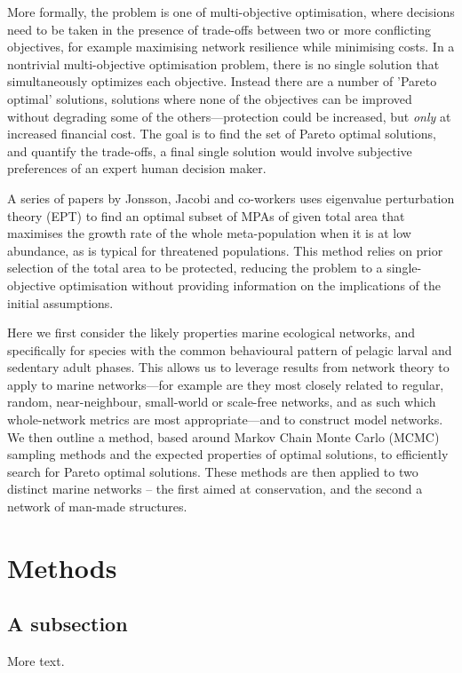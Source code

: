 \documentclass[11pt]{article} %
\begin{document}
More formally, the problem is one of multi-objective optimisation, where decisions need to be taken in the presence of trade-offs between two or more conflicting objectives, for example maximising network resilience while minimising costs. In a nontrivial multi-objective optimisation problem, there is no single solution that simultaneously optimizes each objective. Instead there are a number of 'Pareto optimal' solutions, solutions where none of the objectives can be improved without degrading some of the others---protection could be increased, but \textit{only} at increased financial cost. The goal is to find the set of Pareto optimal solutions, and quantify the trade-offs, a final single solution would involve subjective preferences of an expert human decision maker.

A series of papers by Jonsson, Jacobi and co-workers uses eigenvalue perturbation theory (EPT) to find an optimal subset of MPAs of given total area that maximises the growth rate of the whole meta-population when it is at low abundance, as is typical for threatened populations. This method relies on prior selection of the total area to be protected, reducing the problem to a single-objective optimisation without providing information on the implications of the initial assumptions.

Here we first consider the likely properties marine ecological networks, and specifically for species with the common behavioural pattern of pelagic larval and sedentary adult phases. This allows us to leverage results from network theory to apply to marine networks---for example are they most closely related to regular, random, near-neighbour, small-world or scale-free networks, and as such which whole-network metrics are most appropriate---and to construct model networks. We then outline a method, based around Markov Chain Monte Carlo (MCMC) sampling methods and the expected properties of optimal solutions, to efficiently search for Pareto optimal solutions. These methods are then applied to two distinct marine networks -- the first aimed at conservation, and the second a network of man-made structures.

\section{Methods}


\subsection{A subsection}



More text.


\printbibliography
\end{document}
